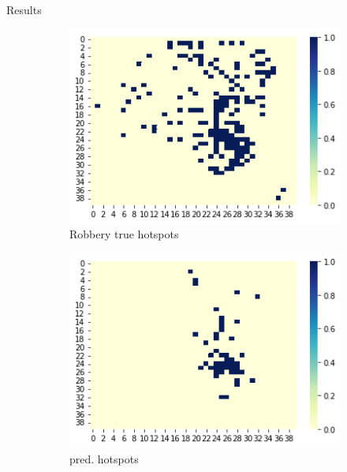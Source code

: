\documentclass[10pt]{beamer}
\begin{document}
\begin{frame}{Results}
\begin{figure}[!htb]
{    \begin{subfigure}{.32\textwidth}
        \centering
        \includegraphics[width=1\linewidth, height=0.3\textheight]{true_robbery_hotspots.png}
        \caption{Robbery true hotspots}
    \end{subfigure}%
    \begin{subfigure}{0.32\textwidth}
        \centering
        \includegraphics[width=1\linewidth, height=0.3\textheight]{pred_robbery_hotspots.png}
        \caption{pred. hotspots}
    \end{subfigure}%
    \begin{subfigure}{0.32\textwidth}
        \centering

\end{subfigure}}
\end{figure}
\end{frame}
\end{document}

